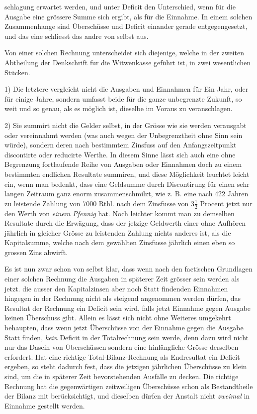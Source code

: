 schlagung erwartet werden, und unter Deficit den Unterschied, wenn für die Ausgabe eine grössere Summe sich ergibt, als für die Einnahme. In einem solchen Zusammenhange sind Überschüsse und Deficit einander gerade entgegengesetzt, und das eine schliesst das andre von selbst aus.

Von einer solchen Rechnung unterscheidet sich diejenige, welche in der zweiten Abtheilung der Denkschrift fur die Witwenkasse geführt ist, in zwei wesentlichen Stücken.

1) Die letztere vergleicht nicht die Ausgaben und Einnahmen für Ein Jahr, oder für einige Jahre, sondern umfasst beide für die ganze unbegrenzte Zukunft, so weit und so genau, als es möglich ist, dieselbe im Voraus zu veranschlagen.

2) Sie summirt nicht die Gelder selbst, in der Grösse wie sie werden verausgabt oder vereinnahmt werden (was auch wegen der Unbegrenztheit ohne Sinn sein würde), sondern deren nach bestimmtem Zinsfuss auf den Anfangszeitpunkt discontirte oder reducirte Werthe. In diesem Sinne lässt sich auch eine ohne Begrenzung fortlaufende Reihe von Ausgaben oder Einnahmen doch zu einem bestimmten endlichen Resultate summiren, und diese Möglichkeit leuchtet leicht ein, wenn man bedenkt, dass eine Geldsumme durch Discontirung für einen sehr langen Zeitraum ganz enorm zusammenschmilzt, wie z. B. eine nach 422 Jahren zu leistende Zahlung von 7000 Rthl. nach dem Zinsfusse von \(3\tfrac{1}{2}\) Procent jetzt nur den Werth von \textit{einem Pfennig} hat. Noch leichter kommt man zu demselben Resultate durch die Erwägung, dass der jetzige Geldwerth einer ohne Aufhören jährlich in gleicher Grösse zu leistenden Zahlung nichts anderes ist, als die Kapitalsumme, welche nach dem gewählten Zinsfusse jährlich einen eben so grossen Zins abwirft.

Es ist nun zwar schon von selbst klar, dass wenn nach den factischen Grundlagen einer solchen Rechnung die Ausgaben in späterer Zeit grösser sein werden als jetzt. die ausser den Kapitalzinsen aber noch Statt findenden Einnahmen hingegen in der Rechnung nicht als steigend angenommen werden dürfen, das Resultat der Rechnung ein Deficit sein wird, falls jetzt Einnahme gegen Ausgabe keinen Überschuss gibt. Allein es lässt sich nicht ohne Weiteres umgekehrt behaupten, dass wenn jetzt Überschüsse von der Einnahme gegen die Ausgabe Statt finden, \textit{kein} Deficit in der Totalrechnung sein werde, denn dazu wird nicht nur das Dasein von Überschüssen sondern eine hinlängliche Grösse derselben erfordert. Hat eine richtige Total-Bilanz-Rechnung als Endresultat ein Deficit ergeben, so steht dadurch fest, dass die jetzigen jährlichen Überschüsse zu klein sind, um die in späterer Zeit bevorstehenden Ausfälle zu decken. Die richtige Rechnung hat die gegenwärtigen zeitweiligen Überschüsse schon als Bestandtheile der Bilanz mit berücksichtigt, und dieselben dürfen der Anstalt nicht \textit{zweimal} in Einnahme gestellt werden.

